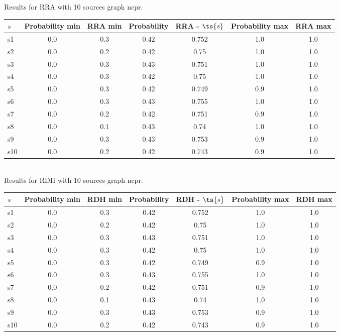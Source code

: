 \documentclass{article}
\begin{document}
\noindent Results for RRA with 10 sources graph ncpr.

\noindent\begin{tabular}{|l|c|c|c|c|c|c|}
\hline
$s$& Probability min & RRA min & Probability & RRA - $\ts{s}$ & Probability max & RRA max\\
\hline
s1 &0.0 & 0.3 & 0.42 & 0.752 & 1.0 & 1.0\\
\hline
s2 &0.0 & 0.2 & 0.42 & 0.75 & 1.0 & 1.0\\
\hline
s3 &0.0 & 0.3 & 0.43 & 0.751 & 1.0 & 1.0\\
\hline
s4 &0.0 & 0.3 & 0.42 & 0.75 & 1.0 & 1.0\\
\hline
s5 &0.0 & 0.3 & 0.42 & 0.749 & 0.9 & 1.0\\
\hline
s6 &0.0 & 0.3 & 0.43 & 0.755 & 1.0 & 1.0\\
\hline
s7 &0.0 & 0.2 & 0.42 & 0.751 & 0.9 & 1.0\\
\hline
s8 &0.0 & 0.1 & 0.43 & 0.74 & 1.0 & 1.0\\
\hline
s9 &0.0 & 0.3 & 0.43 & 0.753 & 0.9 & 1.0\\
\hline
s10 &0.0 & 0.2 & 0.42 & 0.743 & 0.9 & 1.0\\
\hline
\end{tabular}\\

\noindent Results for RDH with 10 sources graph ncpr.

\noindent\begin{tabular}{|l|c|c|c|c|c|c|}
\hline
$s$& Probability min & RDH min & Probability & RDH - $\ts{s}$ & Probability max & RDH max\\
\hline
s1 &0.0 & 0.3 & 0.42 & 0.752 & 1.0 & 1.0\\
\hline
s2 &0.0 & 0.2 & 0.42 & 0.75 & 1.0 & 1.0\\
\hline
s3 &0.0 & 0.3 & 0.43 & 0.751 & 1.0 & 1.0\\
\hline
s4 &0.0 & 0.3 & 0.42 & 0.75 & 1.0 & 1.0\\
\hline
s5 &0.0 & 0.3 & 0.42 & 0.749 & 0.9 & 1.0\\
\hline
s6 &0.0 & 0.3 & 0.43 & 0.755 & 1.0 & 1.0\\
\hline
s7 &0.0 & 0.2 & 0.42 & 0.751 & 0.9 & 1.0\\
\hline
s8 &0.0 & 0.1 & 0.43 & 0.74 & 1.0 & 1.0\\
\hline
s9 &0.0 & 0.3 & 0.43 & 0.753 & 0.9 & 1.0\\
\hline
s10 &0.0 & 0.2 & 0.42 & 0.743 & 0.9 & 1.0\\
\hline
\end{tabular}\\
\end{document}
